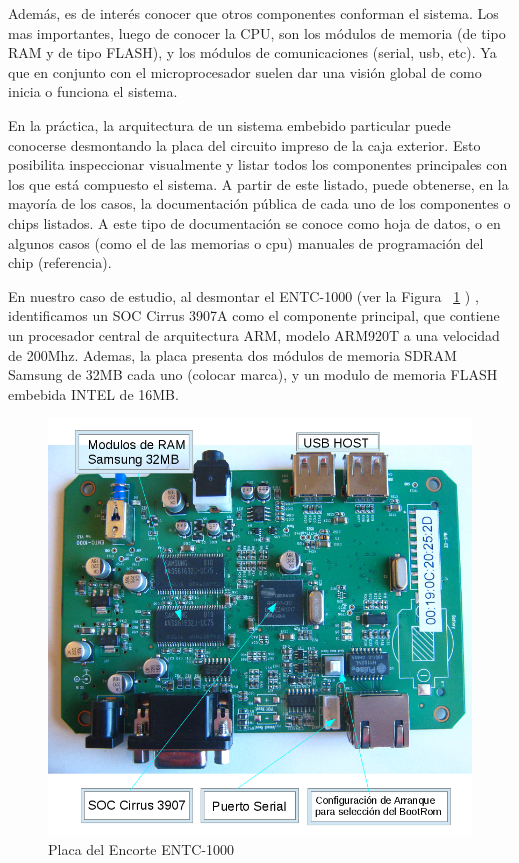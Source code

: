 \documentclass[conference]{IEEEtran}
\begin{document}
Además, es de interés conocer que otros componentes conforman
el sistema. Los mas importantes, luego de conocer la CPU,
son los módulos de memoria (de
tipo RAM y de tipo FLASH), y los módulos de comunicaciones (serial, usb, etc).
Ya que en conjunto con el microprocesador suelen dar una visión
global de como inicia o funciona el sistema.

En la práctica, la arquitectura de un sistema embebido particular puede conocerse desmontando
la placa del circuito impreso de la caja exterior. Esto posibilita
inspeccionar visualmente y listar todos los componentes principales con los
que está compuesto el sistema. A partir de este listado, puede
obtenerse, en la mayoría de los casos, la documentación pública
de cada uno de los componentes o chips listados.
A este tipo de documentación se conoce como hoja de datos, o
en algunos casos (como el de las memorias o cpu) manuales de programación
del chip (referencia).

En nuestro caso de estudio, al desmontar el ENTC-1000 (ver la Figura ~\ref{fig:placa-encore} )
, identificamos
un SOC Cirrus 3907A como el componente principal,
que contiene un procesador central de arquitectura ARM, modelo ARM920T
a una velocidad de 200Mhz.
Ademas, la placa presenta dos módulos de memoria SDRAM Samsung de 32MB cada uno (colocar marca), y un modulo
de memoria FLASH embebida INTEL de 16MB.

\begin{figure}
\begin{center}
\includegraphics[scale=0.40]{placa-encore.png}
\caption{Placa del Encorte ENTC-1000}
\label{fig:placa-encore}
\end{center}
\end{figure}
\end{document}
